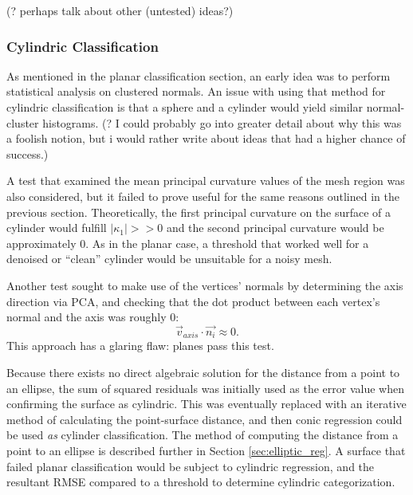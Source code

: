 (? perhaps talk about other (untested) ideas?)

\subsubsection{Cylindric Classification}

As mentioned in the planar classification section, an early idea was to perform statistical analysis on clustered normals.
An issue with using that method for cylindric classification is that a sphere and a cylinder would yield similar normal-cluster histograms.
(? I could probably go into greater detail about why this was a foolish notion, but i would rather write about ideas that had a higher chance of success.)

A test that examined the mean principal curvature values of the mesh region was also considered, but it failed to prove useful for the same reasons outlined in the previous section.
Theoretically, the first principal curvature on the surface of a cylinder would fulfill $|\kappa_1| >> 0$ and the second principal curvature would be approximately 0.
As in the planar case, a threshold that worked well for a denoised or ``clean'' cylinder would be unsuitable for a noisy mesh.

Another test sought to make use of the vertices' normals by determining the axis direction via PCA, and checking that the dot product between each vertex's normal and the axis was roughly 0:
\begin{equation}
	\vec{v}_{axis} \cdot \vec{n_i} \approx 0.
\end{equation}
This approach has a glaring flaw: planes pass this test.


Because there exists no direct algebraic solution for the distance from a point to an ellipse, the sum of squared residuals was initially used as the error value when confirming the surface as cylindric.
This was eventually replaced with an iterative method of calculating the point-surface distance, and then conic regression could be used \textit{as} cylinder classification.
The method of computing the distance from a point to an ellipse is described further in Section \ref{sec:elliptic_reg}.
A surface that failed planar classification would be subject to cylindric regression, and the resultant RMSE compared to a threshold to determine cylindric categorization.

